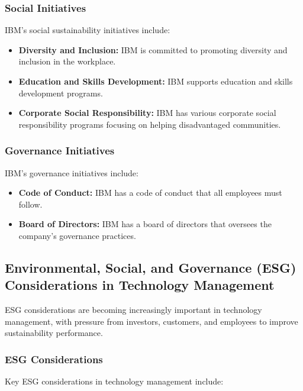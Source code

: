 \subsubsection{Social Initiatives}

IBM's social sustainability initiatives include:

\begin{itemize}
    \item \textbf{Diversity and Inclusion:} IBM is committed to promoting diversity and inclusion in the workplace.
    \item \textbf{Education and Skills Development:} IBM supports education and skills development programs.
    \item \textbf{Corporate Social Responsibility:} IBM has various corporate social responsibility programs focusing on helping disadvantaged communities.
\end{itemize}

\subsubsection{Governance Initiatives}

IBM's governance initiatives include:

\begin{itemize}
    \item \textbf{Code of Conduct:} IBM has a code of conduct that all employees must follow.
    \item \textbf{Board of Directors:} IBM has a board of directors that oversees the company's governance practices.
\end{itemize}

\subsection{Environmental, Social, and Governance (ESG) Considerations in Technology Management}

ESG considerations are becoming increasingly important in technology management, with pressure from investors, customers, and employees to improve sustainability performance.

\subsubsection{ESG Considerations}

Key ESG considerations in technology management include:

